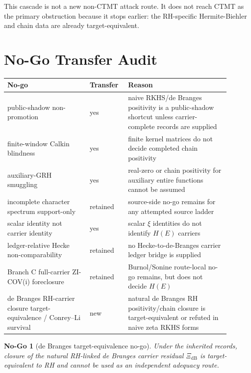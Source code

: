\documentclass[11pt]{article}
\newtheorem{nogo}{No-Go}
\newcommand{\dB}{\mathrm{dB}}
\newcommand{\XidB}{\Xi_{\dB}}
\begin{document}
This cascade is not a new non-CTMT attack route.  It does not reach CTMT as
the primary obstruction because it stops earlier: the RH-specific
Hermite-Biehler and chain data are already target-equivalent.

\section*{No-Go Transfer Audit}

\begin{center}
\begin{tabular}{p{0.34\linewidth}p{0.14\linewidth}p{0.42\linewidth}}
\toprule
No-go & Transfer & Reason\\
\midrule
public-shadow non-promotion & yes
& naive RKHS/de Branges positivity is a public-shadow shortcut unless carrier-complete records are supplied\\
finite-window Calkin blindness & yes
& finite kernel matrices do not decide completed chain positivity\\
auxiliary-GRH smuggling & yes
& real-zero or chain positivity for auxiliary entire functions cannot be assumed\\
incomplete character spectrum support-only & retained
& source-side no-go remains for any attempted source ladder\\
scalar identity not carrier identity & yes
& scalar \(\xi\) identities do not identify \(H(E)\) carriers\\
ledger-relative Hecke non-comparability & retained
& no Hecke-to-de-Branges carrier ledger bridge is supplied\\
Branch C full-carrier ZI-COV(i) foreclosure & retained
& Burnol/Sonine route-local no-go remains, but does not decide \(H(E)\)\\
de Branges RH-carrier closure target-equivalence / Conrey--Li survival & new
& natural de Branges RH positivity/chain closure is target-equivalent or refuted in naive zeta RKHS forms\\
\bottomrule
\end{tabular}
\end{center}

\begin{nogo}[de Branges target-equivalence no-go]
Under the inherited records, closure of the natural RH-linked de Branges
carrier residual \(\XidB\) is target-equivalent to RH and cannot be used as an
independent adequacy route.
\end{nogo}
\end{document}

